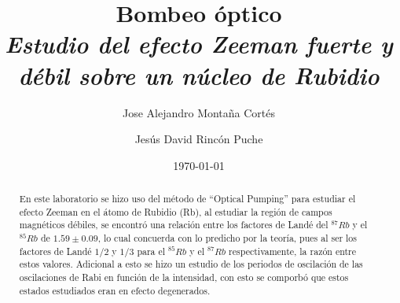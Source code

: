 \documentclass[%
 reprint,
 amsmath,amssymb,
 aps,
]{revtex4-1}
\newcommand{\subtitle}[1]{%
\posttitle{%
    \par\end{center}
\begin{center}\large#1\end{center}
\vskip0.5em}%
}
\begin{document}

\title{Bombeo óptico\\ \textit{Estudio del efecto Zeeman fuerte y débil sobre un núcleo de Rubidio } }%


\author{Jose Alejandro Montaña Cortés}
\author{Jesús David Rincón Puche}%
%


\date{\today}%

\begin{abstract}
En este laboratorio se hizo uso del método de ``Optical Pumping'' para estudiar el efecto Zeeman en el átomo de Rubidio (Rb), al estudiar la región de campos magnéticos débiles, se encontró una relación entre los factores de Landé del $^{87}Rb$ y el $^{85}Rb$ de  $1.59\pm  0.09$, lo cual concuerda con lo predicho por la teoría, pues al ser los factores de Landé $1/2$ y $1/3$ para el $^{85}Rb$ y el $^{87}Rb$ respectivamente, la razón entre estos valores. Adicional a esto se hizo un estudio de los periodos de oscilación de las oscilaciones de Rabi en función de la intensidad, con esto se comporbó que estos estados estudiados eran en efecto degenerados.


\end{abstract}
\maketitle

\end{document}
